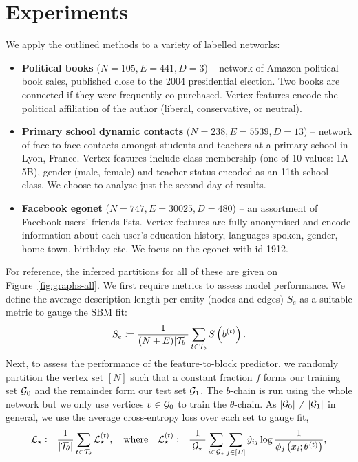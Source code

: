 \section{Experiments}
\label{sec:experiments}

We apply the outlined methods to a variety of labelled networks:

\begin{itemize}
	\item \textbf{Political books} \cite{polbooks} ($N=105, E=441, D=3$) -- network of Amazon political book sales, published close to the 2004 presidential election. Two books are connected if they were frequently co-purchased. Vertex features encode the political affiliation of the author (liberal, conservative, or neutral).
	\item \textbf{Primary school dynamic contacts} \cite{schools} ($N=238, E=5539, D=13$) -- network of face-to-face contacts amongst students and teachers at a primary school in Lyon, France. Vertex features include class membership (one of 10 values: 1A-5B), gender (male, female) and teacher status encoded as an 11th school-class. We choose to analyse just the second day of results.
	\item \textbf{Facebook egonet} \cite{fb-snap} ($N=747, E=30025, D=480$) -- an assortment of Facebook users' friends lists. Vertex features are fully anonymised and encode information about each user's education history, languages spoken, gender, home-town, birthday etc. We focus on the egonet with id 1912.
\end{itemize}
%
For reference, the inferred partitions for all of these are given on Figure~\ref{fig:graphs-all}.
We first require metrics to assess model performance. We define the average
description length per entity (nodes and edges) $\bar{S}_e$ as a suitable metric to gauge the SBM fit:
%
\begin{equation}
	\bar{S}_e \coloneqq \frac{1}{(N+E) |\mathcal{T}_b|} \sum_{t\in \mathcal{T}_b} S \left( b^{(t)} \right).
	\label{eqn:mean-dl}
\end{equation}
%
Next, to assess the performance of the feature-to-block predictor, 
we randomly partition the vertex set $[N]$ such that a constant fraction $f$ forms our training set $\mathcal{G}_0$ and the remainder form our test set $\mathcal{G}_1$.
The $b$-chain is run using the whole network but we only use vertices $v \in \mathcal{G}_0$ to train the $\theta$-chain. As $|\mathcal{G}_0| \neq |\mathcal{G}_1|$ in general, we use the average cross-entropy loss 
over each set to gauge fit,
%
\begin{equation}
	\bar{\mathcal{L}}_\star \coloneqq \frac{1}{|\mathcal{T}_\theta|} \sum_{t \in \mathcal{T}_\theta} \mathcal{L}_\star^{(t)},
	\quad \textrm{where} \quad
	\mathcal{L}_\star^{(t)} \coloneqq \frac{1}{|\mathcal{G}_\star|} \sum_{i \in \mathcal{G}_\star}\sum_{j \in [B]} \hat{y}_{ij} \log \frac{1}{\phi_j \left(x_i; \theta^{(t)} \right)},
	\label{eqn:cross-entropy-loss}
\end{equation}
